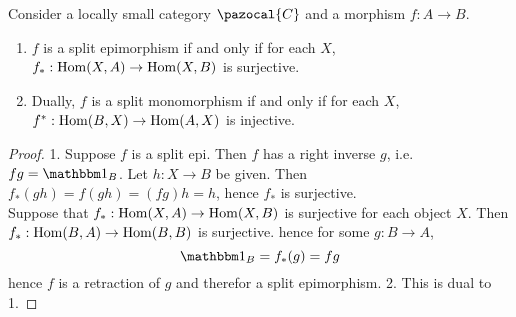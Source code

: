 \begin{lemma}
    Consider a locally small category $\pazocal{C}$ and a morphism $f:A\rightarrow B$.
    \begin{enumerate}
        \item $f$ is a split epimorphism if and only if for each $X$, $f_\ast: \mathrm{Hom}(X,A) \rightarrow \mathrm{Hom}(X,B)$ is surjective. 
        \item Dually, $f$ is a split monomorphism if and only if for each $X$, $f^\ast : \mathrm{Hom}(B,X)\rightarrow \mathrm{Hom}(A,X)$ is injective. 
    \end{enumerate}
\end{lemma}
\begin{proof}
    1. Suppose $f$ is a split epi. Then $f$ has a right inverse $g$, i.e. $fg = \fone_B$. Let $h: X \rightarrow B$ be given. Then $f_\ast(gh)= f(gh)=(fg)h = h$, hence $f_\ast$ is surjective.\\ 
    Suppose that $f_\ast: \mathrm{Hom}(X,A)\rightarrow \mathrm{Hom}(X,B)$ is surjective for each object $X$. Then $f_\ast: \mathrm{Hom}(B,A) \rightarrow \mathrm{Hom}(B,B)$ is surjective. hence for some $g:B\rightarrow A$, 
    $$
        \fone_B=f_\ast(g) = fg
    $$ 
    hence $f$ is a retraction of $g$ and therefor a split epimorphism. 
    2. This is dual to 1. 
\end{proof}
